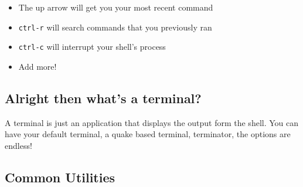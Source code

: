 \begin{itemize}
\tightlist
\item
  The up arrow will get you your most recent command
\item
  \texttt{ctrl-r} will search commands that you previously ran
\item
  \texttt{ctrl-c} will interrupt your shell's process
\item
  Add more!
\end{itemize}

\subsection{Alright then what's a terminal?}

A terminal is just an application that displays the output form the shell. You can have your default terminal, a quake based terminal, terminator, the options are endless!

\subsection{Common Utilities}

